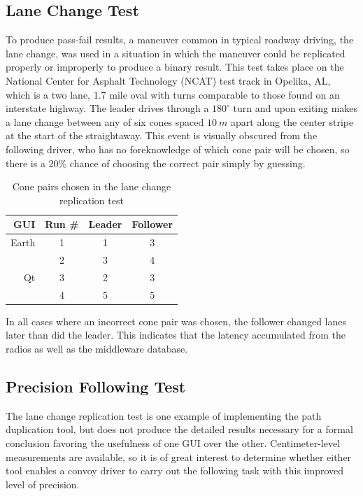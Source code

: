 \documentclass[twocolumn,10pt]{article}
\begin{document}
  \subsection*{Lane Change Test}

    To produce pass-fail results, a maneuver common in typical roadway driving, the lane change, was used in a situation in which the maneuver could be replicated properly or improperly to produce a binary result.  This test takes place on the National Center for Asphalt Technology (NCAT) test track in Opelika, AL, which is a two lane, 1.7 mile oval with turns comparable to those found on an interstate highway.  The leader drives through a $180^{\circ}$ turn and upon exiting makes a lane change between any of six cones spaced $10~m$ apart along the center stripe at the start of the straightaway.  This event is visually obscured from the following driver, who has no foreknowledge of which cone pair will be chosen, so there is a 20\% chance of choosing the correct pair simply by guessing.

    \begin{table}[htbp] \centering
      \caption{Cone pairs chosen in the lane change replication test}
      \begin{tabular}{rc|cc} 
        GUI&    Run \#  &     Leader&    Follower \\\hline\hline
        Earth&      1       &       1   &    3 \\
             &      2       &       3   &    4 \\ \hline
        Qt   &      3       &       2   &    3 \\
             &      4       &       5   &    5 \\ \hline   
      \end{tabular}
      \label{tab:lanechangeresults}
    \end{table}

    In all cases where an incorrect cone pair was chosen, the follower changed lanes later than did the leader.  This indicates that the latency accumulated from the radios as well as the middleware database.


  \subsection*{Precision Following Test}

    The lane change replication test is one example of implementing the path duplication tool, but does not produce the detailed results necessary for a formal conclusion favoring the usefulness of one GUI over the other.  Centimeter-level measurements are available, so it is of great interest to determine whether either tool enables a convoy driver to carry out the following task with this improved level of precision.
    
\end{document}
